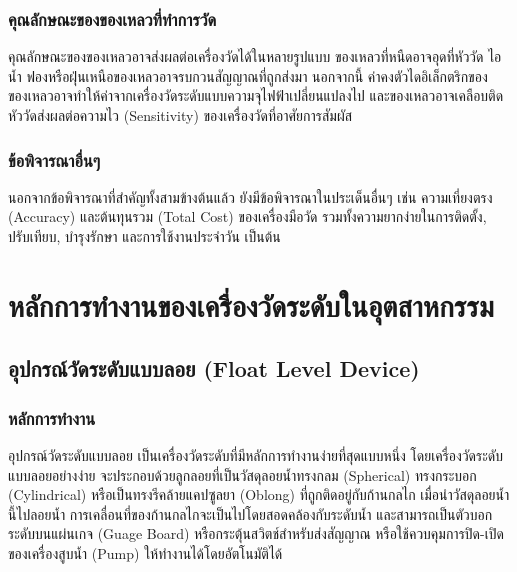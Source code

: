 \documentclass[final,11pt,a4paper]{article}
\begin{document}
\subsubsection{คุณลักษณะของของเหลวที่ทำการวัด}
คุณลักษณะของของเหลวอาจส่งผลต่อเครื่องวัดได้ในหลายรูปแบบ ของเหลวที่หนืดอาจอุดที่หัววัด ไอน้ำ ฟองหรือฝุ่นเหนือของเหลวอาจรบกวนสัญญาณที่ถูกส่งมา 
นอกจากนี้ ค่าคงตัวไดอิเล็กตริกของของเหลวอาจทำให้ค่าจากเครื่องวัดระดับแบบความจุไฟฟ้าเปลี่ยนแปลงไป
และของเหลวอาจเคลือบติดหัววัดส่งผลต่อความไว (Sensitivity) ของเครื่องวัดที่อาศัยการสัมผัส 
\subsubsection{ข้อพิจารณาอื่นๆ} นอกจากข้อพิจารณาที่สำคัญทั้งสามข้างต้นแล้ว ยังมีข้อพิจารณาในประเด็นอื่นๆ เช่น 
ความเที่ยงตรง (Accuracy) และต้นทุนรวม (Total Cost) ของเครื่องมือวัด รวมทั้งความยากง่ายในการติดตั้ง, ปรับเทียบ, บำรุงรักษา 
และการใช้งานประจำวัน เป็นต้น

\newpage
\section{หลักการทำงานของเครื่องวัดระดับในอุตสาหกรรม}
\subsection{อุปกรณ์วัดระดับแบบลอย (Float Level Device)}
\subsubsection{หลักการทำงาน} 
อุปกรณ์วัดระดับแบบลอย เป็นเครื่องวัดระดับที่มีหลักการทำงานง่ายที่สุดแบบหนึ่ง
โดยเครื่องวัดระดับแบบลอยอย่างง่าย จะประกอบด้วยลูกลอยที่เป็นวัสดุลอยน้ำทรงกลม (Spherical) ทรงกระบอก (Cylindrical)
หรือเป็นทรงรีคล้ายแคปซูลยา (Oblong) ที่ถูกติดอยู่กับก้านกลไก เมื่อนำวัสดุลอยน้ำนี้ไปลอยน้ำ การเคลื่อนที่ของก้านกลไกจะเป็นไปโดยสอดคล้องกับระดับน้ำ
และสามารถเป็นตัวบอกระดับบนแผ่นเกจ (Guage Board) หรือกระตุ้นสวิตช์สำหรับส่งสัญญาณ หรือใช้ควบคุมการปิด-เปิดของเครื่องสูบน้ำ (Pump) ให้ทำงานได้โดยอัตโนมัติได้  
\end{document}

